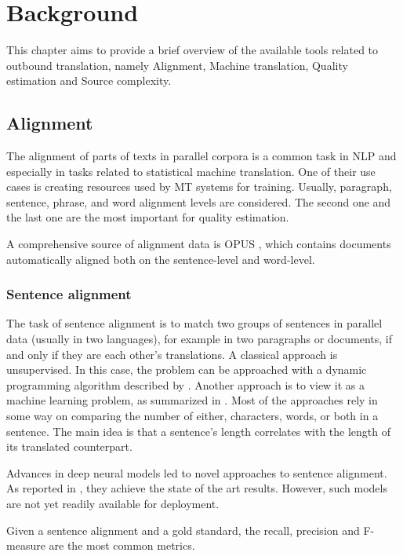 \chapter{Background}

This chapter aims to provide a brief overview of the available tools related to outbound translation, namely Alignment, Machine translation, Quality estimation and Source complexity.

\section{Alignment}

The alignment of parts of texts in parallel corpora is a common task in NLP and especially in tasks related to statistical machine translation. One of their use cases is creating resources used by MT systems for training. Usually, paragraph, sentence, phrase, and word alignment levels are considered. The second one and the last one are the most important for quality estimation.

A comprehensive source of alignment data is OPUS \citep{opus:2012}, which contains documents automatically aligned both on the sentence-level and word-level.

\subsection{Sentence alignment}
The task of sentence alignment is to match two groups of sentences in parallel data (usually in two languages), for example in two paragraphs or documents, if and only if they are each other's translations. A classical approach is unsupervised. In this case, the problem can be approached with a dynamic programming algorithm described by \cite{gale_church:1993}. Another approach is to view it as a machine learning problem, as summarized in \cite{yu_revisiting:2012}. Most of the approaches rely in some way on comparing the number of either, characters, words, or both in a sentence. The main idea is that a sentence's length correlates with the length of its translated counterpart.

Advances in deep neural models led to novel approaches to sentence alignment. As reported in \cite{bucc:2017}, they achieve the state of the art results. However, such models are not yet readily available for deployment.

Given a sentence alignment and a gold standard, the recall, precision and F-measure are the most common metrics.

